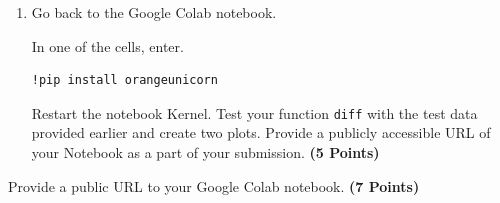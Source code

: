\documentclass[12pt, xcolor=dvipsnames,svgnames,x11names]{article}
\begin{document}
\begin{enumerate}
or (older method)


\begin{verbatim}
uv add twine
twine upload dist/*
\end{verbatim}

You may also need to edit README.md that is auto-generated in the project folder so that it doesn't stay empty. An empty README.md might cause an error while uploading .whl package to \url{https://pypi.org/}.

Here, you may encounter two issues: (i) how to generate a Token as a password, (ii) naming issues with your .whl or .tar.gz file. You must figure out how to solve this as part of your assignment.

\item Go back to the Google Colab notebook.

In one of the cells, enter.

\begin{verbatim}
!pip install orangeunicorn
\end{verbatim}

Restart the notebook Kernel. Test your function \texttt{diff} with the test data provided earlier and create two plots. Provide a publicly accessible URL of your Notebook as a part of your submission. \hfill \textbf{(5 Points)}

\end{enumerate}

Provide a public URL to your Google Colab notebook. \hfill \textbf{(7 Points)}
\end{document}
